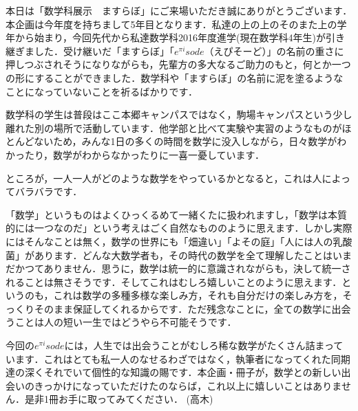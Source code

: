 本日は「数学科展示　ますらぼ」にご来場いただき誠にありがとうございます．本企画は今年度を持ちまして5年目となります．私達の上の上のそのまた上の学年から始まり，今回先代から私達数学科2016年度進学(現在数学科4年生)が引き継ぎました．受け継いだ「ますらぼ」「$e^{\pi i}sode$（えぴそーど）」の名前の重さに押しつぶされそうになりながらも，先輩方の多大なるご助力のもと，何とか一つの形にすることができました．数学科や「ますらぼ」の名前に泥を塗るようなことになっていないことを祈るばかりです．

数学科の学生は普段はここ本郷キャンパスではなく，駒場キャンパスという少し離れた別の場所で活動しています．他学部と比べて実験や実習のようなものがほとんどないため，みんな1日の多くの時間を数学に没入しながら，日々数学がわかったり，数学がわからなかったりに一喜一憂しています．

ところが，一人一人がどのような数学をやっているかとなると，これは人によってバラバラです．

「数学」というものはよくひっくるめて一緒くたに扱われますし，「数学は本質的には一つなのだ」という考えはごく自然なもののように思えます．しかし実際にはそんなことは無く，数学の世界にも「畑違い」「よその庭」「人には人の乳酸菌」があります．どんな大数学者も，その時代の数学を全て理解したことはいまだかつてありません．思うに，数学は統一的に意識されながらも，決して統一されることは無さそうです．そしてこれはむしろ嬉しいことのように思えます．というのも，これは数学の多種多様な楽しみ方，それも自分だけの楽しみ方を，そっくりそのまま保証してくれるからです．ただ残念なことに，全ての数学に出会うことは人の短い一生ではどうやら不可能そうです．

今回の$e^{\pi i}sode$には，人生では出会うことがむしろ稀な数学がたくさん詰まっています．これはとても私一人のなせるわざではなく，執筆者になってくれた同期達の深くそれでいて個性的な知識の賜です．本企画・冊子が，数学との新しい出会いのきっかけになっていただけたのならば，これ以上に嬉しいことはありません．是非1冊お手に取ってみてください．
(高木)
